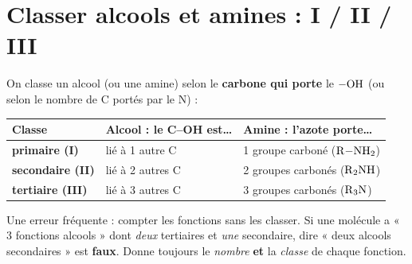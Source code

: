\documentclass[11pt,a4paper]{article}
\begin{document}
\section{Classer alcools et amines : I / II / III}
On classe un alcool (ou une amine) selon le \textbf{carbone qui porte} le $\ce{-OH}$ (ou selon le nombre de C portés par le N) :
\begin{center}\small\renewcommand{\arraystretch}{1.05}
\begin{tabular}{lll}
\toprule
Classe & Alcool : le C--OH est\dots & Amine : l'azote porte\dots \\
\midrule
\textbf{primaire (I)} & lié à 1 autre C & 1 groupe carboné ($\ce{R-NH2}$) \\
\textbf{secondaire (II)} & lié à 2 autres C & 2 groupes carbonés ($\ce{R2NH}$) \\
\textbf{tertiaire (III)} & lié à 3 autres C & 3 groupes carbonés ($\ce{R3N}$) \\
\bottomrule
\end{tabular}
\end{center}
\begin{astuce}
Une erreur fréquente : compter les fonctions sans les classer. Si une molécule a « 3 fonctions alcools » dont \emph{deux} tertiaires et \emph{une} secondaire, dire « deux alcools secondaires » est \textbf{faux}. Donne toujours le \emph{nombre} \textbf{et} la \emph{classe} de chaque fonction.
\end{astuce}
\end{document}
